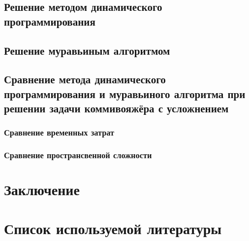\subsection{Решение методом динамического программирования}
\subsection{Решение муравьиным алгоритмом}
\subsection{Сравнение метода динамического программирования и муравьиного алгоритма при решении задачи коммивояжёра с усложнением}
\subsubsection{Сравнение временных затрат}
\subsubsection{Сравнение пространсвенной сложности}
\section*{Заключение}

\newpage
\section*{Список используемой литературы}

